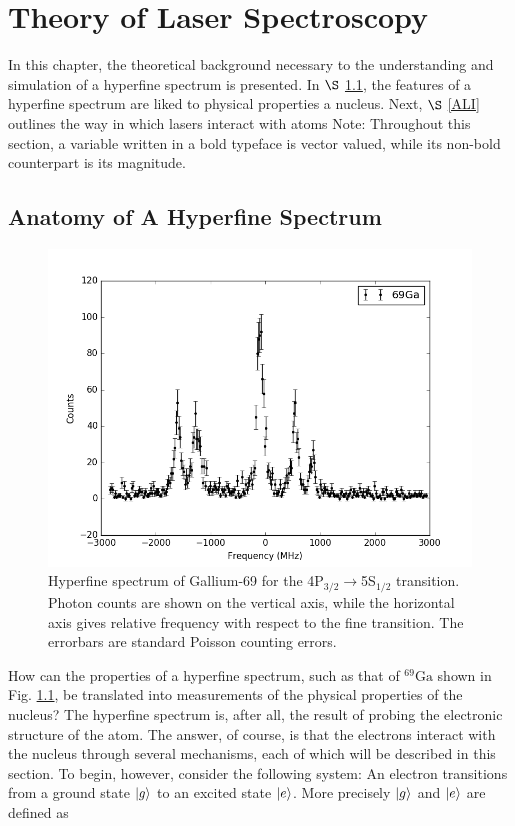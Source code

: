 
\chapter{Theory of Laser Spectroscopy}
In this chapter, the theoretical background necessary to the understanding and simulation of a hyperfine spectrum is presented. In $\S$ \ref{AHF}, the features of a hyperfine spectrum are liked to physical properties a nucleus. Next, $\S$ \ref{ALI} outlines the way in which lasers interact with atoms
Note: Throughout this section, a variable written in a bold typeface is vector valued, while its non-bold counterpart is its magnitude. 
\section{Anatomy of A Hyperfine Spectrum}
\label{AHF}
\begin{figure}[h]
\includegraphics[width=\textwidth]{Graphics/ga69.png}
\caption{Hyperfine spectrum of Gallium-69 for the 4P$_{3/2}\rightarrow$5S$_{1/2}$ transition. Photon counts are shown on the vertical axis, while the horizontal axis gives relative frequency with respect to the fine transition. The errorbars are standard Poisson counting errors.}
\label{ga69}
\end{figure}
How can the properties of a hyperfine spectrum, such as that of $^{69}\mathrm{Ga}$ shown in Fig. \ref{ga69}, be translated into measurements of the physical properties of the nucleus? The hyperfine spectrum is, after all, the result of probing the electronic structure of the atom. The answer, of course, is that the electrons interact with the nucleus through several mechanisms, each of which will be described in this section. To begin, however, consider the following system: An electron transitions from a ground state $\ket{g}$ to an excited state $\ket{e}$. More precisely $\ket{g}$ and $\ket{e}$ are defined as 
